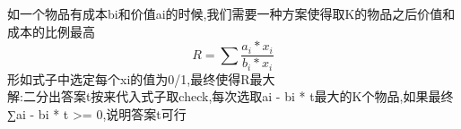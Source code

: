 
如一个物品有成本bi和价值ai的时候,我们需要一种方案使得取K的物品之后价值和成本的比例最高
\begin{displaymath}
R=\sum \frac{{a}_{i}*{x}_{i}}{{b}_{i}*{x}_{i}}
\end{displaymath}
形如式子中选定每个xi的值为0/1,最终使得R最大\\
解:二分出答案t按来代入式子取check,每次选取ai - bi * t最大的K个物品,如果最终∑ai - bi * t >= 0,说明答案t可行